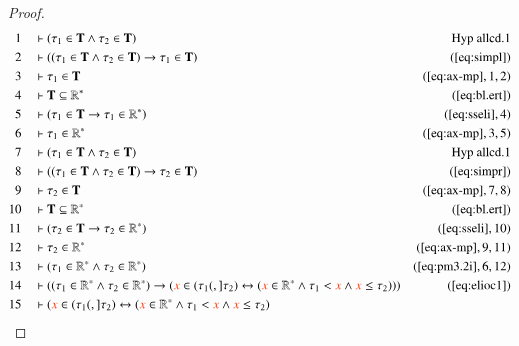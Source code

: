 \begin{proof}\label{proof:bl.allcd}
\begin{align}
  1 &&  & \vdash ( \tau_1 \in \mathbf{T} \wedge \tau_2 \in \mathbf{T}
      )&\text{Hyp~allcd.1}\notag%
  \\ 2 &&  & \vdash ( ( \tau_1 \in \mathbf{T} \wedge \tau_2 \in \mathbf{T} )
      \rightarrow \tau_1 \in \mathbf{T}
      )&(\mbox{\ref{eq:simpl}})\notag
  \\ 3 &&  & \vdash \tau_1 \in \mathbf{T}&(\mbox{\ref{eq:ax-mp}},1,2)\notag
  \\ 4 &&  & \vdash \mathbf{T} \subseteq
      \mathbb{R}^{\ast}&(\mbox{\ref{eq:bl.ert}})\notag
  \\ 5 &&  & \vdash ( \tau_1 \in \mathbf{T} \rightarrow \tau_1 \in
      \mathbb{R}^{\ast} )&(\mbox{\ref{eq:sseli}},4)\notag
  \\ 6 &&  & \vdash \tau_1 \in \mathbb{R}^{\ast}&(\mbox{\ref{eq:ax-mp}},3,5)\notag
  \\ 7 &&  & \vdash ( \tau_1 \in \mathbf{T} \wedge \tau_2 \in \mathbf{T}
      )&\text{Hyp~allcd.1}\notag%
  \\ 8 &&  & \vdash ( ( \tau_1 \in \mathbf{T} \wedge \tau_2 \in \mathbf{T} )
      \rightarrow \tau_2 \in \mathbf{T}
      )&(\mbox{\ref{eq:simpr}})\notag
  \\ 9 &&  & \vdash \tau_2 \in \mathbf{T}&(\mbox{\ref{eq:ax-mp}},7,8)\notag
  \\ 10 &&  & \vdash \mathbf{T} \subseteq
      \mathbb{R}^{\ast}&(\mbox{\ref{eq:bl.ert}})\notag
  \\ 11 &&  & \vdash ( \tau_2 \in \mathbf{T} \rightarrow \tau_2 \in
      \mathbb{R}^{\ast} )&(\mbox{\ref{eq:sseli}},10)\notag
  \\ 12 &&  & \vdash \tau_2 \in
      \mathbb{R}^{\ast}&(\mbox{\ref{eq:ax-mp}},9,11)\notag
  \\ 13 &&  & \vdash ( \tau_1 \in \mathbb{R}^{\ast} \wedge \tau_2 \in
      \mathbb{R}^{\ast} )&(\mbox{\ref{eq:pm3.2i}},6,12)\notag
  \\ 14 &&  & \vdash ( ( \tau_1 \in \mathbb{R}^{\ast} \wedge \tau_2 \in
      \mathbb{R}^{\ast} ) \rightarrow ( \msc{x} \in ( \tau_1
      (,] \tau_2 ) \leftrightarrow ( \msc{x} \in
      \mathbb{R}^{\ast} \wedge \tau_1 < \msc{x} \wedge \msc{x}
      \le \tau_2 ) ) )&(\mbox{\ref{eq:elioc1}})\notag
  \\ 15 &&  & \vdash ( \msc{x} \in ( \tau_1 (,] \tau_2 ) \leftrightarrow (
      \msc{x} \in \mathbb{R}^{\ast} \wedge \tau_1 < \msc{x}
      \wedge \msc{x} \le \tau_2 )

\end{align}
\end{proof}
